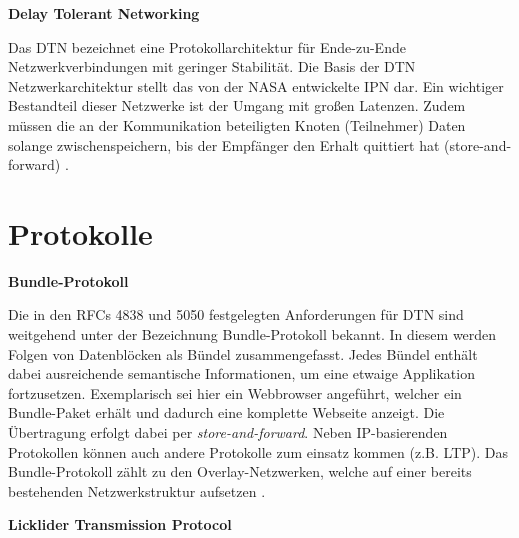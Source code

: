 \textbf{Delay Tolerant Networking}

Das \gls{DTN} bezeichnet eine Protokollarchitektur f{\"u}r
Ende-zu-Ende Netzwerkverbindungen mit geringer Stabilit{\"a}t. Die Basis der
\gls{DTN} Netzwerkarchitektur stellt das von der NASA entwickelte \gls{IPN} dar. Ein wichtiger
Bestandteil dieser Netzwerke ist der Umgang mit gro{\ss}en Latenzen. Zudem
m{\"u}ssen die an der Kommunikation beteiligten Knoten (Teilnehmer)
Daten solange zwischenspeichern, bis der Empf{\"a}nger den Erhalt quittiert hat
(store-and-forward) \cite{web3}.

\section{Protokolle}

\textbf{Bundle-Protokoll}

Die in den RFCs 4838 und 5050 festgelegten Anforderungen f{\"u}r \gls{DTN} sind
weitgehend unter der Bezeichnung Bundle-Protokoll bekannt. In diesem werden
Folgen von Datenbl{\"o}cken als B{\"u}ndel zusammengefasst. Jedes B{\"u}ndel enth{\"a}lt
dabei ausreichende semantische Informationen, um eine etwaige Applikation
fortzusetzen. Exemplarisch sei hier ein Webbrowser angef{\"u}hrt, welcher ein
Bundle-Paket erh{\"a}lt und dadurch eine komplette Webseite anzeigt.
Die {\"U}bertragung erfolgt dabei per \textit{store-and-forward}. Neben
IP-basierenden Protokollen k{\"o}nnen auch andere Protokolle zum einsatz kommen
(z.B. LTP). Das Bundle-Protokoll z{\"a}hlt zu den Overlay-Netzwerken, welche
auf einer bereits bestehenden Netzwerkstruktur aufsetzen \cite{web1}.

\textbf{Licklider Transmission Protocol}

